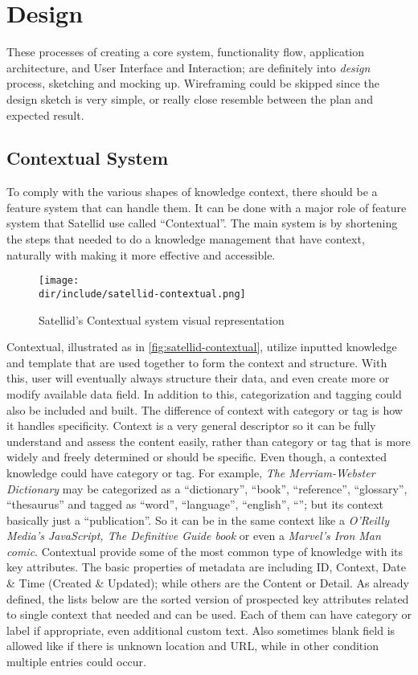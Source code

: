 \section{Design}
\label{sec:design}

These processes of creating a core system, functionality flow, application architecture, and User Interface and Interaction; are definitely into \textit{design} process, sketching and mocking up.
Wireframing could be skipped since the design sketch is very simple, or really close resemble between the plan and expected result.

\subsection{Contextual System}

To comply with the various shapes of knowledge context, there should be a feature system that can handle them.
It can be done with a major role of feature system that Satellid use called ``Contextual''.
The main system is by shortening the steps that needed to do a knowledge management that have context, naturally with making it more effective and accessible.

\begin{figure}[htb]
    \centering
    \texttt{[image: \\dir/include/satellid-contextual.png]}
    \caption{Satellid's Contextual system visual representation}
    \label{fig:satellid-contextual}
\end{figure}

Contextual, illustrated as in \autoref{fig:satellid-contextual}, utilize inputted knowledge and template that are used together to form the context and structure.
With this, user will eventually always structure their data, and even create more or modify available data field.
In addition to this, categorization and tagging could also be included and built.
The difference of context with category or tag is how it handles specificity.
Context is a very general descriptor so it can be fully understand and assess the content easily, rather than category or tag that is more widely and freely determined or should be specific.
Even though, a contexted knowledge could have category or tag.
For example, \textit{The Merriam-Webster Dictionary} may be categorized as a ``dictionary'', ``book'', ``reference'', ``glossary'', ``thesaurus'' and tagged as ``word'', ``language'', ``english'', ``''; but its context basically just a ``publication''.
So it can be in the same context like a \textit{O'Reilly Media's JavaScript, The Definitive Guide book} or even a \textit{Marvel's Iron Man comic}.
Contextual provide some of the most common type of knowledge with its key attributes.
The basic properties of metadata are including ID, Context, Date \& Time (Created \& Updated); while others are the Content or Detail.
As already defined, the lists below are the sorted version of prospected key attributes related to single context that needed and can be used.
Each of them can have category or label if appropriate, even additional custom text.
Also sometimes blank field is allowed like if there is unknown location and \ac{URL}, while in other condition multiple entries could occur.

